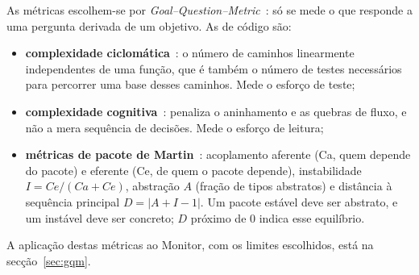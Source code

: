 As métricas escolhem-se por \emph{Goal--Question--Metric}~\cite{basili1994}: só se mede o que responde a uma
pergunta derivada de um objetivo. As de código são:
\begin{itemize}
  \item \textbf{complexidade ciclomática}~\cite{mccabe1976}: o número de caminhos linearmente
        independentes de uma função, que é também o número de testes necessários para percorrer uma
        base desses caminhos. Mede o esforço de teste;
  \item \textbf{complexidade cognitiva}~\cite{campbell2018}: penaliza o aninhamento e as quebras de
        fluxo, e não a mera sequência de decisões. Mede o esforço de leitura;
  \item \textbf{métricas de pacote de Martin}~\cite{martin2002}: acoplamento aferente (Ca, quem depende do
        pacote) e eferente (Ce, de quem o pacote depende), instabilidade $I = Ce/(Ca+Ce)$, abstração $A$
        (fração de tipos abstratos) e distância à sequência principal $D = |A + I - 1|$. Um pacote estável
        deve ser abstrato, e um instável deve ser concreto; $D$ próximo de 0 indica esse equilíbrio.
\end{itemize}
A aplicação destas métricas ao Monitor, com os limites escolhidos, está na
secção~\ref{sec:gqm}.
